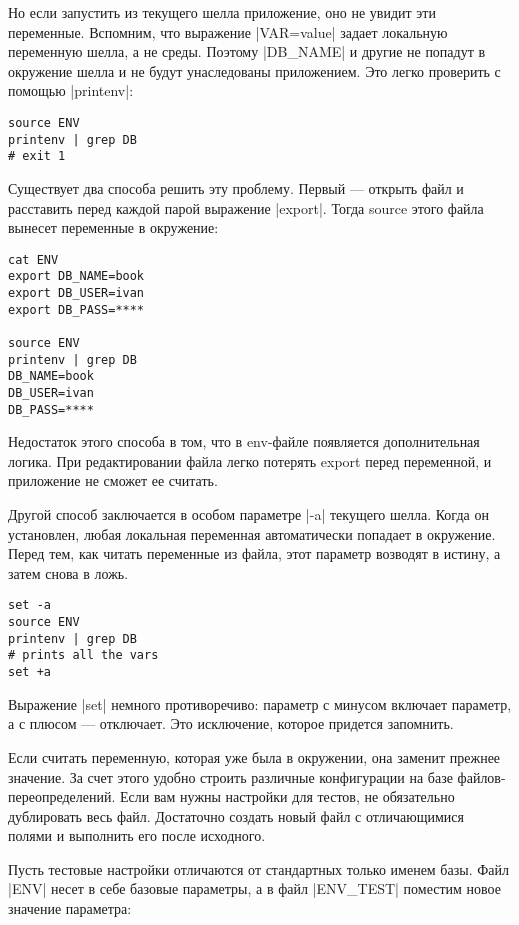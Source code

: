 Но если запустить из текущего шелла приложение, оно не увидит эти
переменные. Вспомним, что выражение \spverb|VAR=value| задает локальную переменную
шелла, а не среды. Поэтому \spverb|DB_NAME| и другие не попадут в окружение шелла и не
будут унаследованы приложением. Это легко проверить с помощью \spverb|printenv|:

\begin{verbatim}
source ENV
printenv | grep DB
# exit 1
\end{verbatim}

Существует два способа решить эту проблему. Первый — открыть файл и расставить
перед каждой парой выражение \spverb|export|. Тогда source этого файла вынесет
переменные в окружение:

\begin{verbatim}
cat ENV
export DB_NAME=book
export DB_USER=ivan
export DB_PASS=****

source ENV
printenv | grep DB
DB_NAME=book
DB_USER=ivan
DB_PASS=****
\end{verbatim}

Недостаток этого способа в том, что в env-файле появляется дополнительная
логика. При редактировании файла легко потерять export перед переменной, и
приложение не сможет ее считать.

Другой способ заключается в особом параметре \spverb|-a| текущего шелла. Когда он
установлен, любая локальная переменная автоматически попадает в окружение. Перед
тем, как читать переменные из файла, этот параметр возводят в истину, а затем
снова в ложь.

\begin{verbatim}
set -a
source ENV
printenv | grep DB
# prints all the vars
set +a
\end{verbatim}

Выражение \spverb|set| немного противоречиво: параметр с минусом включает параметр, а с
плюсом — отключает. Это исключение, которое придется запомнить.

Если считать переменную, которая уже была в окружении, она заменит прежнее
значение. За счет этого удобно строить различные конфигурации на базе
файлов-переопределений. Если вам нужны настройки для тестов, не обязательно
дублировать весь файл. Достаточно создать новый файл с отличающимися полями и
выполнить его после исходного.

Пусть тестовые настройки отличаются от стандартных только именем базы. Файл
\spverb|ENV| несет в себе базовые параметры, а в файл \spverb|ENV_TEST| поместим новое
значение параметра:

